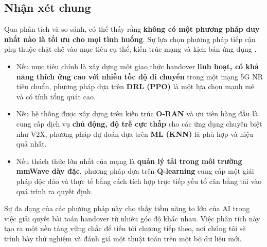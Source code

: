 \documentclass{article} %
\begin{document}
\subsection{Nhận xét chung}
Qua phân tích và so sánh, có thể thấy rằng \textbf{không có một phương pháp duy nhất nào là tối ưu cho mọi tình huống}. Sự lựa chọn phương pháp tiếp cận phụ thuộc chặt chẽ vào mục tiêu cụ thể, kiến trúc mạng và kịch bản ứng dụng .
\begin{itemize}
    \item Nếu mục tiêu chính là xây dựng một giao thức handover \textbf{linh hoạt, có khả năng thích ứng cao với nhiều tốc độ di chuyển} trong một mạng 5G NR tiêu chuẩn, phương pháp dựa trên \textbf{DRL (PPO)} là một lựa chọn mạnh mẽ và có tính tổng quát cao.
    \item Nếu hệ thống được xây dựng trên kiến trúc \textbf{O-RAN} và ưu tiên hàng đầu là cung cấp dịch vụ \textbf{chủ động, độ trễ cực thấp} cho các ứng dụng chuyên biệt như V2X, phương pháp dự đoán dựa trên \textbf{ML (KNN)} là phù hợp và hiệu quả nhất.
    \item Nếu thách thức lớn nhất của mạng là \textbf{quản lý tải trong môi trường mmWave dày đặc}, phương pháp dựa trên \textbf{Q-learning} cung cấp một giải pháp độc đáo và thực tế bằng cách tích hợp trực tiếp yếu tố cân bằng tải vào quá trình ra quyết định.
\end{itemize}
Sự đa dạng của các phương pháp này cho thấy tiềm năng to lớn của AI trong việc giải quyết bài toán handover từ nhiều góc độ khác nhau. Việc phân tích này tạo ra một nền tảng vững chắc để tiến tới chương tiếp theo, nơi chúng tôi sẽ trình bày thử nghiệm và đánh giá một thuật toán trên một bộ dữ liệu mới.
\end{document}
